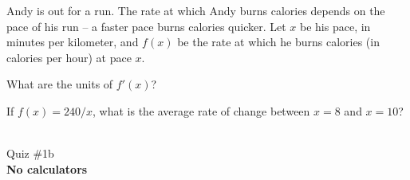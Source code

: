 \documentclass[12pt]{article}
\newcommand{\version}{}
\newcommand{\xzero}{}
\newcommand{\xone}{}
\newcommand{\xtwo}{}
\newcommand{\xthree}{}
\newcommand{\xfour}{}
\newcommand{\xfive}{}
\newcommand{\ExamName}{Quiz \#1\version}
\begin{document}
\begin{enumerate}
  \setcounter{problemnumber}{0}
  \Problem
  Andy is out for a run.  The rate at which Andy burns calories
  depends on the pace of his run -- a faster pace burns calories
  quicker.  Let $x$ be his pace, in minutes per kilometer, and $f(x)$ be the
  rate at which he burns calories (in calories per hour) at pace $x$.  
  \begin{enumerate}
    \Part What are the units of $f'(x)$?
    \hfill
    \vfill

    \Part If $f(x) = 240/x$, what is the average rate of change
    between $x=8$ and $x=10$?
    \hfill
    \vfill
  \end{enumerate}

\end{enumerate}
\newpage
\renewcommand{\version}{b}
\renewcommand{\xzero}{0.0}
\renewcommand{\xone}{1.4}
\renewcommand{\xtwo}{3.6}
\renewcommand{\xthree}{5.0}
\renewcommand{\xfour}{6.1}
\renewcommand{\xfive}{7.5}
\setcounter{problemnumber}{0}
% 
\begin{minipage}{0.25\linewidth}
  \CourseName\ \Quarter \\
  \ExamName \\[1em]
  \textbf{No calculators}\\[2em]
\end{minipage}
\hfill
\begin{minipage}[t]{0.4\linewidth}
\end{minipage}
\hfill
\begin{minipage}{0.25\linewidth}
  \vspace*{-3.25em}
  \ \hfill
\end{minipage}
\vspace*{-0.45in}
\end{document}
